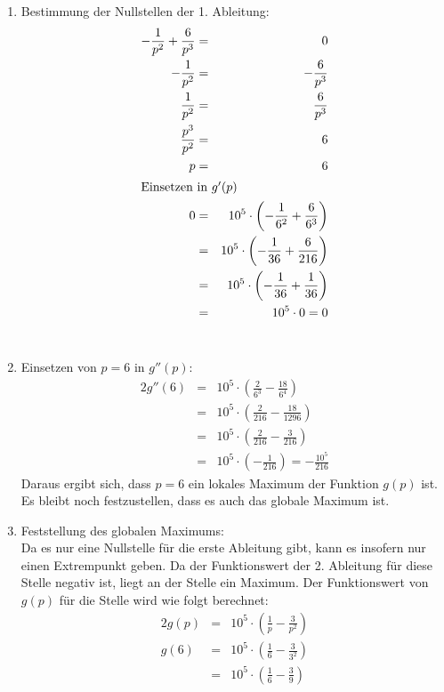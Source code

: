 \documentclass[10pt,a4paper,oneside,ngerman,numbers=noenddot]{scrartcl}
\begin{document}
\begin{enumerate}
	\item Bestimmung der Nullstellen der 1. Ableitung:
	\begin{alignat*}{2}
		-\frac{1}{p^{2}} + \frac{6}{p^{3}} &=& 0 \\
		-\frac{1}{p^{2}} &=& - \frac{6}{p^{3}} \\
		\frac{1}{p^{2}} &=& \frac{6}{p^{3}} \\
		\frac{p^{3}}{p^{2}} &=& 6  \\
		p &=& 6 \\
		\intertext{Einsetzen in $g'(p)$}
		0 &=& 10^{5} \cdot \left(-\frac{1}{6^{2}} + \frac{6}{6^{3}} \right) \\
		  &=& 10^{5} \cdot \left(-\frac{1}{36} + \frac{6}{216} \right) \\
		  &=& 10^{5} \cdot \left(-\frac{1}{36} + \frac{1}{36} \right) \\
		  &=& 10^{5} \cdot 0 = 0
	\end{alignat*} \\
	\item Einsetzen von $p=6$ in $g''(p)$:
	\begin{alignat*}{2}
		g''(6) &=& 10^{5} \cdot \left(\frac{2}{6^{3}} - \frac{18}{6^{4}} \right) \\
			   &=& 10^{5} \cdot \left(\frac{2}{216} - \frac{18}{1296} \right) \\
			   &=& 10^{5} \cdot \left(\frac{2}{216} - \frac{3}{216} \right) \\
			  &=& 10^{5} \cdot \left(- \frac{1}{216} \right) = -\frac{10^{5}}{216} 
	\end{alignat*}
	Daraus ergibt sich, dass $p=6$ ein lokales Maximum der Funktion $g(p)$ ist. Es bleibt noch festzustellen, dass es auch das globale Maximum ist. \\
	\item Feststellung des globalen Maximums:\\
	Da es nur eine Nullstelle für die erste Ableitung gibt, kann es insofern nur einen Extrempunkt geben. Da der Funktionswert der 2. Ableitung für diese Stelle negativ ist, liegt an der Stelle ein Maximum. Der Funktionswert von $g(p)$ für die Stelle wird wie folgt berechnet:
	\begin{alignat*}{2}
		g(p) &=& 10^{5} \cdot \left(\frac{1}{p} - \frac{3}{p^{2}} \right) \\
		g(6) &=& 10^{5} \cdot \left( \frac{1}{6} - \frac{3}{3^{2}} \right) \\
		&=& 10^{5} \cdot \left( \frac{1}{6} - \frac{3}{9} \right) \\

\end{alignat*}
\end{enumerate}
\end{document}
